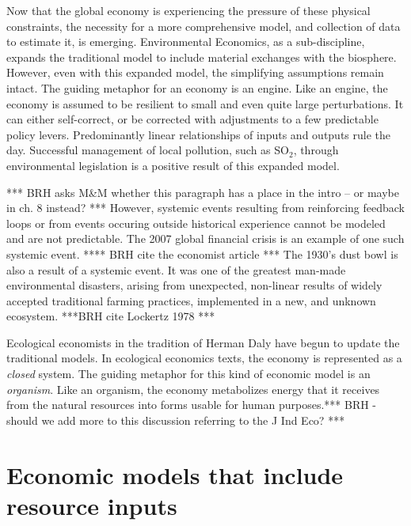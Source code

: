 Now that the global economy is experiencing the pressure of these physical constraints, 
the necessity for a more comprehensive model, and collection of data to estimate it,
is emerging. Environmental Economics, as a sub-discipline, expands the traditional model to include material exchanges with the biosphere. 
However, even with this expanded model, the simplifying assumptions remain intact. The guiding metaphor for 
an economy is an engine. Like an engine, the economy is  assumed 
to be resilient to small and even quite large perturbations.  It can either self-correct, or be corrected with adjustments to
a few predictable policy levers. Predominantly linear relationships of inputs and outputs rule the day. 
Successful management of  local pollution, such as SO$_2$, through environmental legislation
is a positive result of this expanded model.

*** BRH asks M\&M whether this paragraph has a place in the intro -- or maybe in ch. 8 instead? *** However, systemic events resulting from reinforcing feedback loops or from events occuring
outside historical experience cannot be modeled and are not predictable. The 2007 global 
financial crisis is an example of one such systemic event. **** BRH cite the economist article ***
The 1930's dust bowl is also a result of a systemic event. It was one of the greatest man-made
environmental disasters, arising from unexpected, non-linear 
results of widely accepted traditional farming practices, 
implemented in a new, and unknown ecosystem. ***BRH cite Lockertz 1978 ***

Ecological economists in the tradition of Herman Daly have begun to 
update the traditional models. In ecological economics texts, the economy is 
represented as a \emph{closed} system. The guiding metaphor for this kind of economic model is an \emph{organism}. Like an organism,
the economy metabolizes energy that it receives from the natural resources
 into forms usable for human purposes.*** BRH - should we add more to this discussion referring to the J Ind Eco? ***
   

\section{Economic models that include resource inputs}


